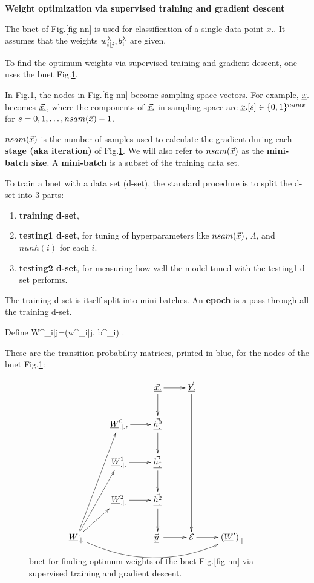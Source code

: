 \begin{center}
\LARGE\textbf{{Weight 
optimization via
supervised training and
gradient descent}}
\end{center}

The bnet of Fig.\ref{fig-nn}
is used for classification
of a single data point $x.$.
It assumes that the
weights $w^\lambda_{i|j}, b_i^\lambda$
are given.

To find the optimum
weights via supervised
training and gradient descent,
one uses the bnet Fig.\ref{fig-nn-ext}.

In Fig.\ref{fig-nn-ext},
the nodes in
Fig.\ref{fig-nn} become 
sampling space vectors.
For example, ${\underline{x}}.$ becomes
$\underline{\vec{x.}}$, where the
components of 
$\underline{\vec{x.}}$ in sampling space are
${\underline{x}}.[s]\in \{0,1\}^{numx}$
for $s=0, 1, \ldots, nsam({\vec{x}})-1$.


$nsam({\vec{x}})$
is the number of
samples used to calculate the
gradient
during each {\bf stage (aka iteration)} of
Fig.\ref{fig-nn-ext}.
We will also  refer to
$nsam({\vec{x}})$ as the {\bf mini-batch size}.
A {\bf mini-batch} is a subset 
of the training data set.



To train a bnet with a data
set (d-set),
the standard procedure
is to split the d-set into 3 parts:
\begin{enumerate}
\item
{\bf training d-set}, 
\item
{\bf testing1 d-set}, for
tuning
of hyperparameters 
like $nsam({\vec{x}})$,  $\Lambda$,
and $nunh(i)$
for each $i$. 
\item
{\bf testing2 d-set}, for measuring
how well the model
tuned with the testing1 d-set
performs.
\end{enumerate}

The training d-set is 
itself split into mini-batches.
An {\bf epoch} is a pass through all 
the training d-set.

Define
\beq
W^\lam_{i|j}=(w^\lam_{i|j}, b^\lam_i)
\;.
\eeq

These are the
transition probability matrices,
printed in blue, for 
the nodes of the bnet 
Fig.\ref{fig-nn-ext}:

\begin{figure}[h!]
\centering
$$\xymatrix{
&&\ranvec{x.}\ar[d]\ar[r]&
\ranvec{Y.}\ar[dddd]\\
&\rvW^0_{.|.}, \ar[r]&
\ranvec{h^0_.}\ar[d]\\
&\rvW^1_{.|.}\ar[r]&
\ranvec{h^1_.}\ar[d]\\
&\rvW^2_{.|.}\ar[r]&
\ranvec{h^2_.}\ar[d]\\
\rvW^._{.|.}\ar[ru]\ar[ruu]\ar[ruuu]
\ar@/_2pc/[rrrr]
&&
\vec{\rvy}.\ar[r]&\cale\ar[r]&
(\rvW')^._{.|.}
}$$
\caption{bnet 
for 
finding optimum
weights of the bnet 
Fig.\ref{fig-nn} via
supervised training
and gradient descent.
}
\label{fig-nn-ext}
\end{figure}


